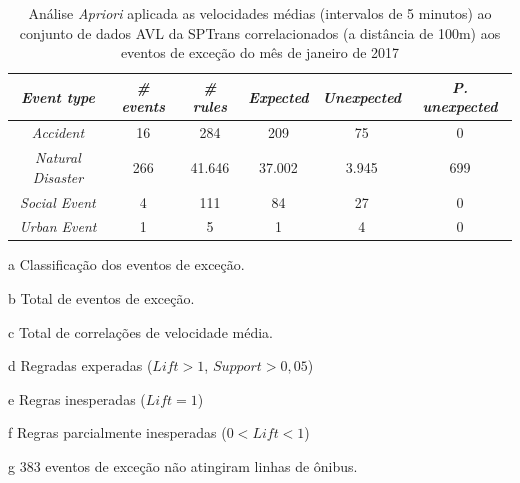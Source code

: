 \documentclass[
	12pt,				%
	oneside,			%
	a4paper,			%
	english,			%
	brazil				%
	]{abntex2ppgsi}
\begin{document}
{{\begin{apendicesenv}
\begin{table}[!htb]
\centering
\begin{threeparttable}
\caption {Análise \textit{Apriori} aplicada as velocidades médias (intervalos de 5 minutos) ao conjunto de dados AVL da SPTrans correlacionados (a distância de 100m) aos eventos de exceção do mês de janeiro de 2017}
\label {tab:aprioriFull}
\begin{tabular}{c|c|c|c|c|c}
\hline
\textbf{\textit{Event type}}\tnote{a} & \textbf{\textit{\# events}}\tnote{b} & \textit{\textbf{\# rules}}\tnote{c} & \textbf{\textit{Expected}}\tnote{d} & \textbf{\textit{Unexpected}}\tnote{e} & \textbf{\textit{P. unexpected}}\tnote{f}   \\
\hline
\textit{Accident} & 16 & 284 & 209 & 75 & 0 \\
\textit{Natural 	Disaster} & 266 & 41.646 & 37.002 & 3.945 & 699 \\
\textit{Social Event} & 4 & 111 & 84 & 27 & 0 \\
\textit{Urban Event} & 1 & 5 & 1 & 4 & 0 \\
\hline
\end{tabular}
\begin{tablenotes}
            \item[a] Classificação dos eventos de exceção.
            \item[b] Total de eventos de exceção.
            \item[c] Total de correlações de velocidade média.
            \item[d] Regradas experadas ($Lift > 1$, $Support > 0,05$)
            \item[e] Regras inesperadas ($Lift = 1$)
            \item[f] Regras parcialmente inesperadas ($0 < Lift < 1$)
            \item[g] 383 eventos de exceção não atingiram linhas de ônibus.
        \end{tablenotes}
\end{threeparttable}
\end{table}


\end{apendicesenv}}}
\end{document}
